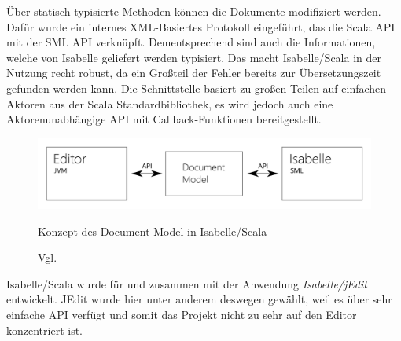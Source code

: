 Über statisch typisierte Methoden können die Dokumente modifiziert werden. Dafür wurde ein internes
XML-Basiertes Protokoll eingeführt, das die Scala API mit der SML API verknüpft. Dementsprechend
sind auch die Informationen, welche von Isabelle geliefert werden typisiert. Das macht
Isabelle/Scala in der Nutzung recht robust, da ein Großteil der Fehler bereits zur Übersetzungszeit
gefunden werden kann. Die Schnittstelle basiert zu großen Teilen auf einfachen Aktoren aus der Scala
Standardbibliothek, es wird jedoch auch eine Aktorenunabhängige API mit Callback-Funktionen
bereitgestellt.

\begin{figure}[ht]
\includegraphics[width=\linewidth]{images/diagram-iscala}
  \caption{Konzept des Document Model in Isabelle/Scala}
  \caption*{Vgl. \cite{iscala}}
  \label{fig:diagram-iscala}
\end{figure}

Isabelle/Scala wurde für und zusammen mit der Anwendung \textit{Isabelle/jEdit} entwickelt. JEdit
wurde hier unter anderem deswegen gewählt, weil es über sehr einfache API verfügt und somit das
Projekt nicht zu sehr auf den Editor konzentriert ist.

